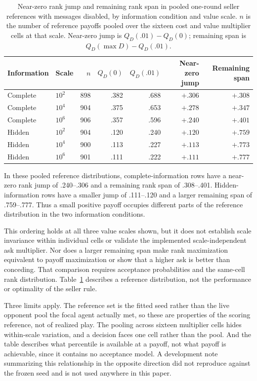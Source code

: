\begin{table}[H]
\centering
\scriptsize
\caption{Near-zero rank jump and remaining rank span in pooled one-round seller
references with messages disabled, by information condition and value scale. $n$ is
the number of reference payoffs pooled over the sixteen cost and value
multiplier cells at that scale. Near-zero jump is
$Q_D(.01)-Q_D(0)$; remaining span is $Q_D(\max D)-Q_D(.01)$.}
\label{tab:rank-ladder}
\setlength{\tabcolsep}{5pt}
\renewcommand{\arraystretch}{0.92}
\begin{tabular}{@{}llrrrrr@{}}
\toprule
Information & Scale & $n$ & $Q_D(0)$ & $Q_D(.01)$ & Near-zero jump & Remaining span \\
\midrule
Complete & $10^2$ & 898 & .382 & .688 & $+.306$ & $+.308$ \\
Complete & $10^4$ & 904 & .375 & .653 & $+.278$ & $+.347$ \\
Complete & $10^6$ & 906 & .357 & .596 & $+.240$ & $+.401$ \\
\midrule
Hidden & $10^2$ & 904 & .120 & .240 & $+.120$ & $+.759$ \\
Hidden & $10^4$ & 900 & .113 & .227 & $+.113$ & $+.773$ \\
Hidden & $10^6$ & 901 & .111 & .222 & $+.111$ & $+.777$ \\
\bottomrule
\end{tabular}
\end{table}

In these pooled reference distributions, complete-information rows have a
near-zero rank jump of .240--.306 and a remaining rank span of .308--.401.
Hidden-information rows have a smaller jump of .111--.120 and a larger
remaining span of .759--.777. Thus a small positive payoff occupies different
parts of the reference distribution in the two information conditions.

This ordering holds at all three value scales shown, but it does not establish
scale invariance within individual cells or validate the implemented
scale-independent ask multiplier. Nor does a larger remaining span make rank
maximization equivalent to payoff maximization or show that a higher ask is
better than conceding. That comparison requires acceptance probabilities and
the same-cell rank distribution. Table~\ref{tab:rank-ladder} describes a
reference distribution, not the performance or optimality of the seller rule.

Three limits apply. The reference set is the fitted seed rather than the live
opponent pool the focal agent actually met, so these are properties of the
scoring reference, not of realized play. The pooling across sixteen multiplier
cells hides within-scale variation, and a decision faces one cell rather than
the pool. And the table describes what percentile is available at a payoff, not
what payoff is achievable, since it contains no acceptance model. A development
note summarizing this relationship in the opposite direction did not reproduce
against the frozen seed and is not used anywhere in this paper.

